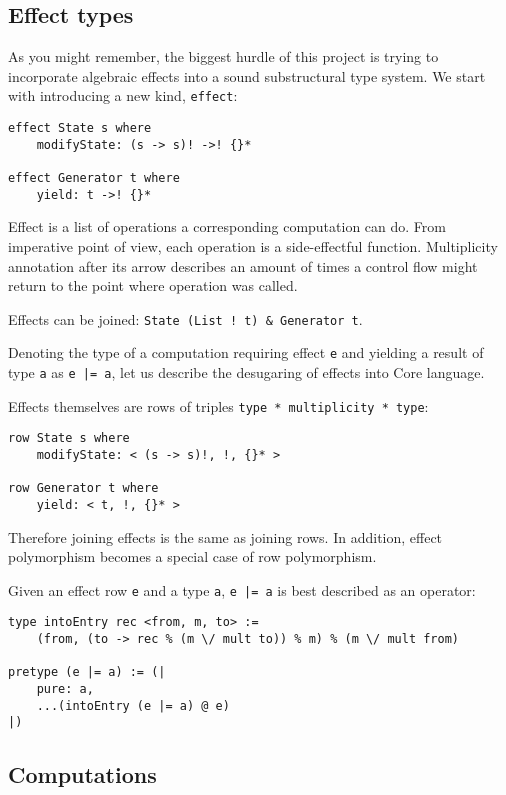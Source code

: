 \documentclass[a4paper,14pt]{extreport}
\begin{document}
\subsection{Effect types}

As you might remember, the biggest hurdle of this project is trying to
incorporate algebraic effects into a sound substructural type system. We start
with introducing a new kind, \verb|effect|:

\begin{verbatim}
effect State s where
    modifyState: (s -> s)! ->! {}*

effect Generator t where
    yield: t ->! {}*
\end{verbatim}

Effect is a list of operations a corresponding computation can do. From
imperative point of view, each operation is a side-effectful function.
Multiplicity annotation after its arrow describes an amount of times a control
flow might return to the point where operation was called.

Effects can be joined: \verb|State (List ! t) & Generator t|.

Denoting the type of a computation requiring effect \verb|e| and yielding a
result of type \verb|a| as \verb+e |= a+, let us describe the desugaring of
effects into Core language.

Effects themselves are rows of triples \verb|type * multiplicity * type|:

\begin{verbatim}
row State s where
    modifyState: < (s -> s)!, !, {}* >

row Generator t where
    yield: < t, !, {}* >
\end{verbatim}

Therefore joining effects is the same as joining rows. In addition, effect
polymorphism becomes a special case of row polymorphism.

Given an effect row \verb|e| and a type \verb|a|, \verb+e |= a+ is best
described as an operator:

\begin{verbatim}
type intoEntry rec <from, m, to> :=
    (from, (to -> rec % (m \/ mult to)) % m) % (m \/ mult from)

pretype (e |= a) := (|
    pure: a,
    ...(intoEntry (e |= a) @ e)
|)
\end{verbatim}

\subsection{Computations}
\end{document}
